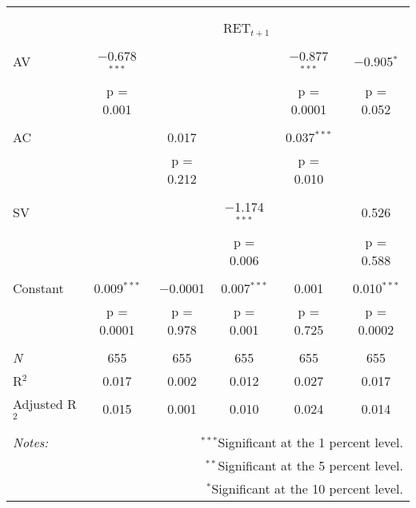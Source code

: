 
\begin{tabular}{@{\extracolsep{5pt}}lccccc} 
\\[-1.8ex]\hline 
\hline \\[-1.8ex] 
\\[-1.8ex] & \multicolumn{5}{c}{RET$_{t+1}$} \\ 
\hline \\[-1.8ex] 
 AV & $-$0.678$^{***}$ &  &  & $-$0.877$^{***}$ & $-$0.905$^{*}$ \\ 
  & p = 0.001 &  &  & p = 0.0001 & p = 0.052 \\ 
  & & & & & \\ 
 AC &  & 0.017 &  & 0.037$^{***}$ &  \\ 
  &  & p = 0.212 &  & p = 0.010 &  \\ 
  & & & & & \\ 
 SV &  &  & $-$1.174$^{***}$ &  & 0.526 \\ 
  &  &  & p = 0.006 &  & p = 0.588 \\ 
  & & & & & \\ 
 Constant & 0.009$^{***}$ & $-$0.0001 & 0.007$^{***}$ & 0.001 & 0.010$^{***}$ \\ 
  & p = 0.0001 & p = 0.978 & p = 0.001 & p = 0.725 & p = 0.0002 \\ 
  & & & & & \\ 
\textit{N} & 655 & 655 & 655 & 655 & 655 \\ 
R$^{2}$ & 0.017 & 0.002 & 0.012 & 0.027 & 0.017 \\ 
Adjusted R$^{2}$ & 0.015 & 0.001 & 0.010 & 0.024 & 0.014 \\ 
\hline 
\hline \\[-1.8ex] 
\textit{Notes:} & \multicolumn{5}{r}{$^{***}$Significant at the 1 percent level.} \\ 
 & \multicolumn{5}{r}{$^{**}$Significant at the 5 percent level.} \\ 
 & \multicolumn{5}{r}{$^{*}$Significant at the 10 percent level.} \\ 
\end{tabular} 
